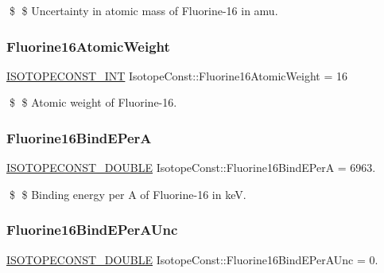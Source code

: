 \$ \$ Uncertainty in atomic mass of Fluorine-\/16 in amu. \mbox{\label{group___isotope_const-_fluorine-_f16_gab6422480f14d5a07e3aab61351e903d0}} 
\subsubsection{\texorpdfstring{Fluorine16\+Atomic\+Weight}{Fluorine16AtomicWeight}}
{\footnotesize\ttfamily \mbox{\hyperlink{group___isotope_const-_macros_ga5f18360b3e99483a35c32d789e62621c}{I\+S\+O\+T\+O\+P\+E\+C\+O\+N\+S\+T\+\_\+\+I\+NT}} Isotope\+Const\+::\+Fluorine16\+Atomic\+Weight = 16}

\$ \$ Atomic weight of Fluorine-\/16. \mbox{\label{group___isotope_const-_fluorine-_f16_gab87082a2d0c771ad0f7c7b3c7a2a0fd6}} 
\subsubsection{\texorpdfstring{Fluorine16\+Bind\+E\+PerA}{Fluorine16BindEPerA}}
{\footnotesize\ttfamily \mbox{\hyperlink{group___isotope_const-_macros_ga8f45a7272ce02c0b4c65c44636ed719a}{I\+S\+O\+T\+O\+P\+E\+C\+O\+N\+S\+T\+\_\+\+D\+O\+U\+B\+LE}} Isotope\+Const\+::\+Fluorine16\+Bind\+E\+PerA = 6963.}

\$ \$ Binding energy per A of Fluorine-\/16 in keV. \mbox{\label{group___isotope_const-_fluorine-_f16_ga57e9ba5efaa59adf66b762308fa6ff36}} 
\subsubsection{\texorpdfstring{Fluorine16\+Bind\+E\+Per\+A\+Unc}{Fluorine16BindEPerAUnc}}
{\footnotesize\ttfamily \mbox{\hyperlink{group___isotope_const-_macros_ga8f45a7272ce02c0b4c65c44636ed719a}{I\+S\+O\+T\+O\+P\+E\+C\+O\+N\+S\+T\+\_\+\+D\+O\+U\+B\+LE}} Isotope\+Const\+::\+Fluorine16\+Bind\+E\+Per\+A\+Unc = 0.}

